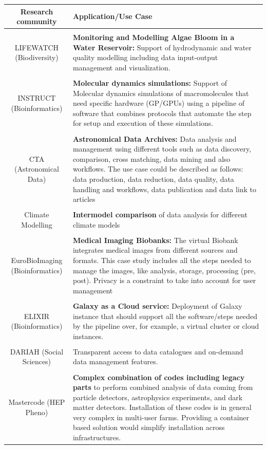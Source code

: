 \documentclass{article}
\begin{document}
\begin{table}
  \centering
  \begin{tabular}{c|p{9cm}}
    {\bf Research community} & {\bf Application/Use Case} \\ \hline \hline
 \\   LIFEWATCH (Biodiversity) & {\bf Monitoring and Modelling Algae Bloom in a Water Reservoir:} Support of hydrodynamic and water quality modelling including data input-output management and visualization. \\ \hline
 \\   INSTRUCT (Bioinformatics) &  {\bf Molecular dynamics simulations:} Support of Molecular dynamics simulations of macromolecules that need specific hardware (GP/GPUs) using a pipeline of software that combines protocols that automate the step for setup and execution of these simulations.  \\ \hline
 \\   CTA (Astronomical Data) & {\bf Astronomical Data Archives:} Data analysis and management using different tools such as data discovery, comparison, cross matching, data mining and also workflows. The use case could be described as follows: data production, data reduction, data quality, data handling and workflows, data publication and data link to articles   \\ \hline
 \\   Climate Modelling &  {\bf Intermodel comparison} of data analysis for different climate models \\ \hline
 \\   EuroBioImaging (Bioinformatics) & {\bf Medical Imaging Biobanks:} The virtual Biobank integrates medical images from different sources and formats. This case study includes all the steps needed to manage the images, like analysis, storage, processing (pre, post). Privacy is a constraint to take into account for user management \\ \hline
 \\   ELIXIR (Bioinformatics) & {\bf Galaxy as a Cloud service:} Deployment of Galaxy instance that should support all the software/steps needed by the pipeline over, for example, a virtual cluster or cloud instances. \\ \hline
 \\   DARIAH (Social Sciences) & Transparent access to data catalogues and on-demand data management features. \\ \hline
 \\   Mastercode (HEP Pheno) & {\bf Complex combination of codes including legacy parts} to perform combined analysis of data coming from particle detectors, astrophysics experiments, and dark matter detectors. Installation of these codes is in general very complex in multi-user farms. Providing a container based solution would simplify installation across infrastructures. \\ \hline

\end{tabular}
\end{table}
\end{document}
